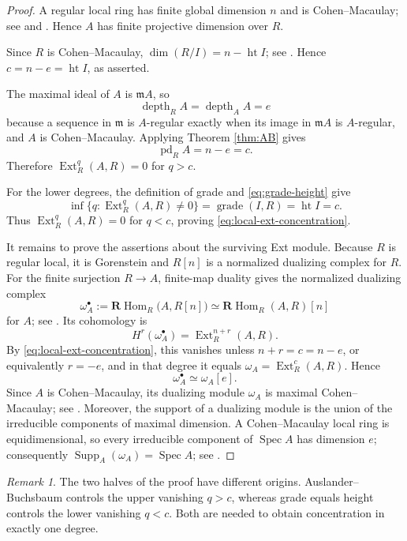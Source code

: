 \documentclass[11pt,a4paper]{article}
\theoremstyle{definition}
\theoremstyle{remark}
\newtheorem{remark}[theorem]{Remark}
\newcommand{\Spec}{\operatorname{Spec}}
\newcommand{\Ext}{\operatorname{Ext}}
\newcommand{\RHom}{\mathbf R\!\operatorname{Hom}}
\newcommand{\depth}{\operatorname{depth}}
\newcommand{\grade}{\operatorname{grade}}
\newcommand{\height}{\operatorname{ht}}
\newcommand{\pd}{\operatorname{pd}}
\newcommand{\Supp}{\operatorname{Supp}}
\begin{document}
\begin{proof}
A regular local ring has finite global dimension $n$ and is
Cohen--Macaulay; see
\cite[Chapter III, Propositions 6.11A and 6.12A]{HartshorneAG} and
\cite[Theorems 17.8 and 19.2]{Matsumura}. Hence $A$ has finite projective dimension
over $R$.

Since $R$ is Cohen--Macaulay, $\dim(R/I)=n-\height I$; see
\cite[Tags 00N9 and 00NA]{Stacks}. Hence $c=n-e=\height I$, as asserted.

The maximal ideal of $A$ is $\mathfrak mA$, so
\[
  \depth_R A=\depth_A A=e
\]
because a sequence in $\mathfrak m$ is $A$-regular exactly when its image
in $\mathfrak mA$ is $A$-regular, and $A$ is Cohen--Macaulay. Applying
Theorem \ref{thm:AB} gives
\[
  \pd_R A=n-e=c.
\]
Therefore $\Ext_R^q(A,R)=0$ for $q>c$.

For the lower degrees, the definition of grade and
\eqref{eq:grade-height} give
\[
  \inf\{q:\Ext_R^q(A,R)\neq 0\}
  =\grade(I,R)=\height I=c.
\]
Thus $\Ext_R^q(A,R)=0$ for $q<c$, proving
\eqref{eq:local-ext-concentration}.

It remains to prove the assertions about the surviving Ext module. Because
$R$ is regular local, it is Gorenstein and $R[n]$ is a normalized dualizing
complex for $R$. For the finite surjection $R\to A$, finite-map duality gives
the normalized dualizing complex
\[
  \omega_A^\bullet
  :=\RHom_R\bigl(A,R[n]\bigr)
  \simeq \RHom_R(A,R)[n]
\]
for $A$; see \cite[Tag 0A7M]{Stacks}. Its cohomology is
\[
  H^r(\omega_A^\bullet)
  =\Ext_R^{n+r}(A,R).
\]
By \eqref{eq:local-ext-concentration}, this vanishes unless
$n+r=c=n-e$, or equivalently $r=-e$, and in that degree it equals
$\omega_A=\Ext_R^c(A,R)$. Hence
\[
  \omega_A^\bullet\simeq\omega_A[e].
\]
Since $A$ is Cohen--Macaulay, its dualizing module $\omega_A$ is maximal
Cohen--Macaulay; see \cite[Tag 0AWS]{Stacks}. Moreover, the support of a dualizing module is the union of
the irreducible components of maximal dimension. A Cohen--Macaulay local ring
is equidimensional, so every irreducible component of $\Spec A$ has dimension
$e$; consequently $\Supp_A(\omega_A)=\Spec A$; see
\cite[Tag 0AWH]{Stacks}.
\end{proof}

\begin{remark}
The two halves of the proof have different origins.  Auslander--Buchsbaum
controls the upper vanishing $q>c$, whereas grade equals height controls the
lower vanishing $q<c$.  Both are needed to obtain concentration in exactly
one degree.
\end{remark}
\end{document}
